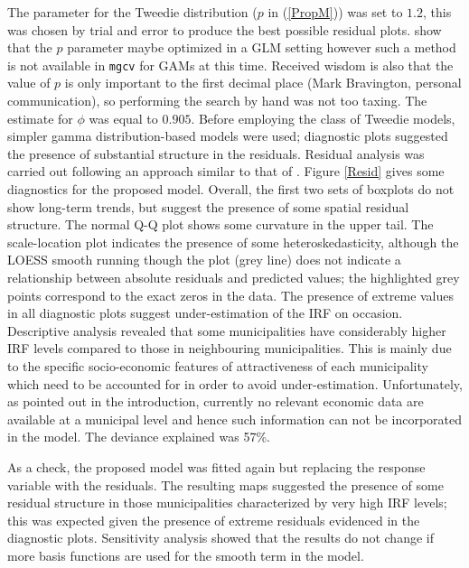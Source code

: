 The parameter for the Tweedie distribution ($p$ in (\ref{PropM})) was set to $1.2$, this was chosen by trial and error to produce the best possible residual plots.  show that the $p$ parameter maybe optimized in a GLM setting however such a method is not available in \texttt{mgcv} for GAMs at this time. Received wisdom is also that the value of $p$ is only important to the first decimal place (Mark Bravington, personal communication), so performing the search by hand was not too taxing. The estimate for $\phi$ was equal to $0.905$. Before employing the class of Tweedie models, simpler gamma distribution-based models were used; diagnostic plots suggested the presence of substantial structure in the residuals. Residual analysis was carried out following an approach similar to that of \label{cor-r25}. Figure \ref{Resid} gives some diagnostics for the proposed model. Overall, the first two sets of boxplots do not show long-term trends, but suggest the presence of some spatial residual structure. The normal Q-Q plot shows some curvature in the upper tail. The scale-location plot indicates the presence of some heteroskedasticity, although the LOESS smooth running though the plot (grey line) does not indicate a relationship between absolute residuals and predicted values; the highlighted grey points correspond to the exact zeros in the data\label{cor-r26-2}. The presence of extreme values in all diagnostic plots suggest under-estimation of the IRF on occasion. Descriptive analysis revealed that some municipalities have considerably higher IRF levels compared to those in neighbouring municipalities. This is mainly due to the specific socio-economic features of attractiveness of each municipality which need to be accounted for in order to avoid under-estimation. Unfortunately, as pointed out in the introduction, currently no relevant economic data are available at a municipal level and hence such information can not be incorporated in the model. The deviance explained was 57\%. 

As a check, the proposed model was fitted again but replacing the response variable with the residuals. The resulting maps suggested the presence of some residual structure in those municipalities characterized by very high IRF levels; this was expected given the presence of extreme residuals evidenced in the diagnostic plots. Sensitivity analysis showed that the results do not change if more basis functions are used for the smooth term in the model. 

